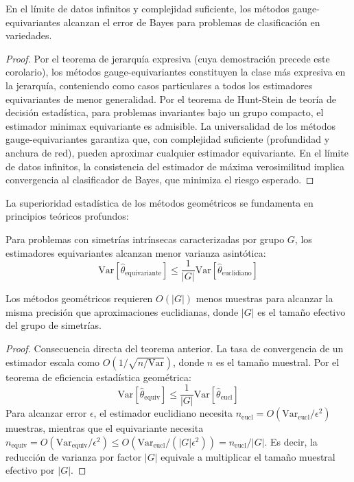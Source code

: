 \begin{corollary}
En el límite de datos infinitos y complejidad suficiente, los métodos gauge-equivariantes alcanzan el error de Bayes para problemas de clasificación en variedades.
\end{corollary}

\begin{proof}
Por el teorema de jerarquía expresiva (cuya demostración precede este corolario), los métodos gauge-equivariantes constituyen la clase más expresiva en la jerarquía, conteniendo como casos particulares a todos los estimadores equivariantes de menor generalidad. Por el teorema de Hunt-Stein de teoría de decisión estadística, para problemas invariantes bajo un grupo compacto, el estimador minimax equivariante es admisible. La universalidad de los métodos gauge-equivariantes garantiza que, con complejidad suficiente (profundidad y anchura de red), pueden aproximar cualquier estimador equivariante. En el límite de datos infinitos, la consistencia del estimador de máxima verosimilitud implica convergencia al clasificador de Bayes, que minimiza el riesgo esperado.
\end{proof}

La superioridad estadística de los métodos geométricos se fundamenta en principios teóricos profundos:

\begin{theorem}
Para problemas con simetrías intrínsecas caracterizadas por grupo $G$, los estimadores equivariantes alcanzan menor varianza asintótica:
\begin{equation}
\text{Var}[\hat{\theta}_{\text{equivariante}}] \leq \frac{1}{|G|} \text{Var}[\hat{\theta}_{\text{euclidiano}}]
\end{equation}
\end{theorem}

\begin{corollary}
Los métodos geométricos requieren $O(|G|)$ menos muestras para alcanzar la misma precisión que aproximaciones euclidianas, donde $|G|$ es el tamaño efectivo del grupo de simetrías.
\end{corollary}

\begin{proof}
Consecuencia directa del teorema anterior. La tasa de convergencia de un estimador escala como $O(1/\sqrt{n/\text{Var}})$, donde $n$ es el tamaño muestral. Por el teorema de eficiencia estadística geométrica:
\[
\text{Var}[\hat{\theta}_{\text{equiv}}] \leq \frac{1}{|G|}\text{Var}[\hat{\theta}_{\text{eucl}}]
\]
Para alcanzar error $\epsilon$, el estimador euclidiano necesita $n_{\text{eucl}} = O(\text{Var}_{\text{eucl}}/\epsilon^2)$ muestras, mientras que el equivariante necesita $n_{\text{equiv}} = O(\text{Var}_{\text{equiv}}/\epsilon^2) \leq O(\text{Var}_{\text{eucl}}/(|G|\epsilon^2)) = n_{\text{eucl}}/|G|$. Es decir, la reducción de varianza por factor $|G|$ equivale a multiplicar el tamaño muestral efectivo por $|G|$.
\end{proof}

